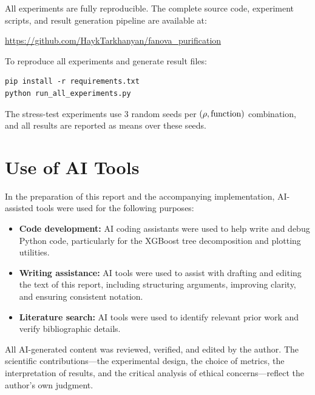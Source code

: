 All experiments are fully reproducible.
The complete source code, experiment scripts, and result generation pipeline are available at:
\begin{center}
\url{https://github.com/HaykTarkhanyan/fanova_purification}
\end{center}

To reproduce all experiments and generate result files:
\begin{verbatim}
pip install -r requirements.txt
python run_all_experiments.py
\end{verbatim}

The stress-test experiments use 3 random seeds per $(\rho, \text{function})$ combination, and all results are reported as means over these seeds.

\chapter{Use of AI Tools}\label{app:ai-tools}

In the preparation of this report and the accompanying implementation, AI-assisted tools were used for the following purposes:
\begin{itemize}
    \item \textbf{Code development:} AI coding assistants were used to help write and debug Python code, particularly for the XGBoost tree decomposition and plotting utilities.
    \item \textbf{Writing assistance:} AI tools were used to assist with drafting and editing the text of this report, including structuring arguments, improving clarity, and ensuring consistent notation.
    \item \textbf{Literature search:} AI tools were used to identify relevant prior work and verify bibliographic details.
\end{itemize}

All AI-generated content was reviewed, verified, and edited by the author.
The scientific contributions---the experimental design, the choice of metrics, the interpretation of results, and the critical analysis of ethical concerns---reflect the author's own judgment.
